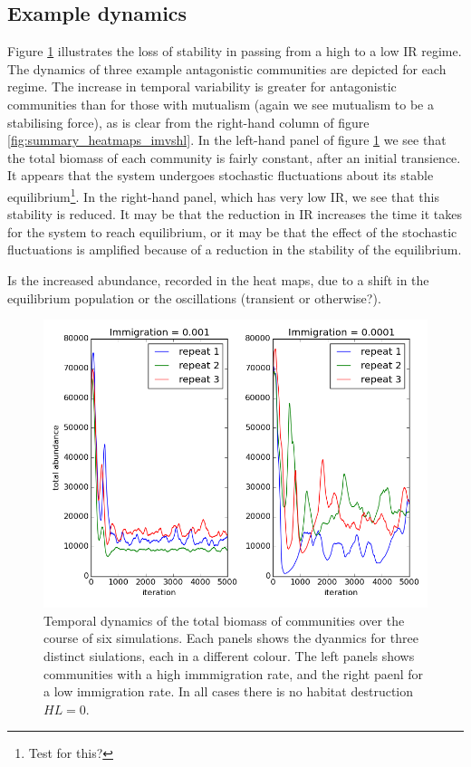\begin{itemize}
\begin{itemize}
\end{itemize}

\newpage
\subsection{Example dynamics}
\label{sec:example_dynamics}

Figure \ref{fig:total_biomass_dynamics} illustrates the loss of stability in passing from a high to a low IR regime. The dynamics of three example antagonistic communities are depicted for each regime. The increase in temporal variability is greater for antagonistic communities than for those with mutualism (again we see mutualism to be a stabilising force), as is clear from the right-hand column of figure \ref{fig:summary_heatmaps_imvshl}. In the left-hand panel of figure \ref{fig:total_biomass_dynamics} we see that the total biomass of each community is fairly constant, after an initial transience. It appears that the system undergoes stochastic fluctuations about its stable equilibrium\footnote{Test for this?}. In the right-hand panel, which has very low IR, we see that this stability is reduced. It may be that the reduction in IR increases the time it takes for the system to reach equilibrium, or it may be that the effect of the stochastic fluctuations is amplified because of a reduction in the stability of the equilibrium.        

Is the increased abundance, recorded in the heat maps, due to a shift in the equilibrium population or the oscillations (transient or otherwise?). 

\begin{figure}[h!]
	\centering	
	\includegraphics[width=0.8\linewidth]{"./chapters/chapter04/figures/total_biomass_dynamics_hl_0_mai_0"}
	\caption{Temporal dynamics of the total biomass of communities over the course of six simulations. Each panels shows the dyanmics for three distinct siulations, each in a different colour. The left panels shows communities with a high immmigration rate, and the right paenl for a low immigration rate. In all cases there is no habitat destruction $HL=0$.}
	\label{fig:total_biomass_dynamics}
\end{figure}


\end{itemize}
